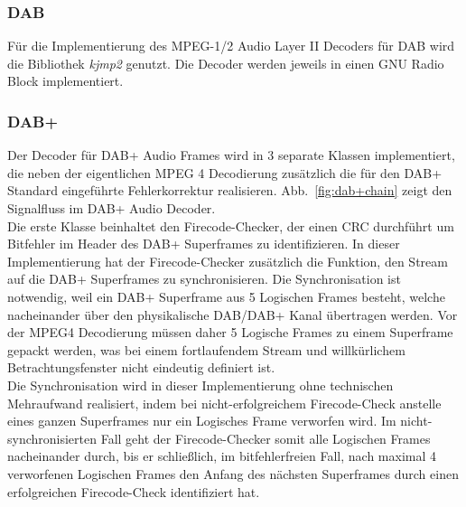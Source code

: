 \subsubsection{DAB}
Für die Implementierung des MPEG-1/2 Audio Layer II Decoders für DAB wird die Bibliothek \textit{kjmp2} \cite{repo:kjmp} genutzt. Die Decoder werden jeweils in einen GNU Radio Block implementiert.\\
\subsubsection{DAB+}
Der Decoder für DAB+ Audio Frames wird in 3 separate Klassen implementiert, die neben der eigentlichen MPEG 4 Decodierung zusätzlich die für den DAB+ Standard eingeführte Fehlerkorrektur realisieren. Abb.~\ref{fig:dab+chain} zeigt den Signalfluss im DAB+ Audio Decoder.\\
Die erste Klasse beinhaltet den Firecode-Checker, der einen CRC durchführt um Bitfehler im Header des DAB+ Superframes zu identifizieren. In dieser Implementierung hat der Firecode-Checker zusätzlich die Funktion, den Stream auf die DAB+ Superframes zu synchronisieren. Die Synchronisation ist notwendig, weil ein DAB+ Superframe aus 5 Logischen Frames besteht, welche nacheinander über den physikalische DAB/DAB+ Kanal übertragen werden. Vor der MPEG4 Decodierung müssen daher 5 Logische Frames zu einem Superframe gepackt werden, was bei einem fortlaufendem Stream und willkürlichem Betrachtungsfenster nicht eindeutig definiert ist.\\
Die Synchronisation wird in dieser Implementierung ohne technischen Mehraufwand realisiert, indem bei nicht-erfolgreichem Firecode-Check anstelle eines ganzen Superframes nur ein Logisches Frame verworfen wird. Im nicht-synchronisierten Fall geht der Firecode-Checker somit alle Logischen Frames nacheinander durch, bis er schließlich, im bitfehlerfreien Fall, nach maximal 4 verworfenen Logischen Frames den Anfang des nächsten Superframes durch einen erfolgreichen Firecode-Check identifiziert hat.\\

